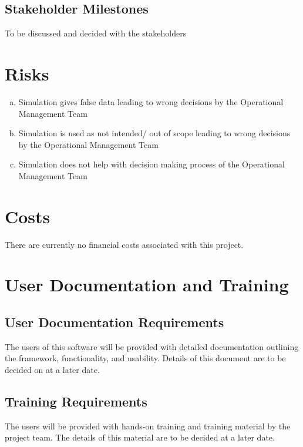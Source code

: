 \documentclass[paper=letter, fontsize=10pt]{scrartcl}
\numberwithin{equation}{section}		%
\numberwithin{figure}{section}			%
\numberwithin{table}{section}				%
\begin{document}
\subsection{Stakeholder Milestones}
To be discussed and decided with the stakeholders
\section{Risks}
\begin{enumerate}[(a)]
	\item Simulation gives false data leading to wrong decisions by the Operational Management Team
	\item Simulation is used as not intended/ out of scope leading to wrong decisions by the Operational Management Team
	\item Simulation does not help with decision making process of the Operational Management Team 
\end{enumerate}
\section{Costs}
There are currently no financial costs associated with this project.

\section{User Documentation and Training}
\subsection{User Documentation Requirements}
The users of this software will be provided with detailed documentation outlining the framework, functionality, and usability. Details of this document are to be decided on at a later date.
\subsection{Training Requirements}
The users will be provided with hands-on training and training material by the project team. The details of this material are to be decided at a later date. 
\end{document}
